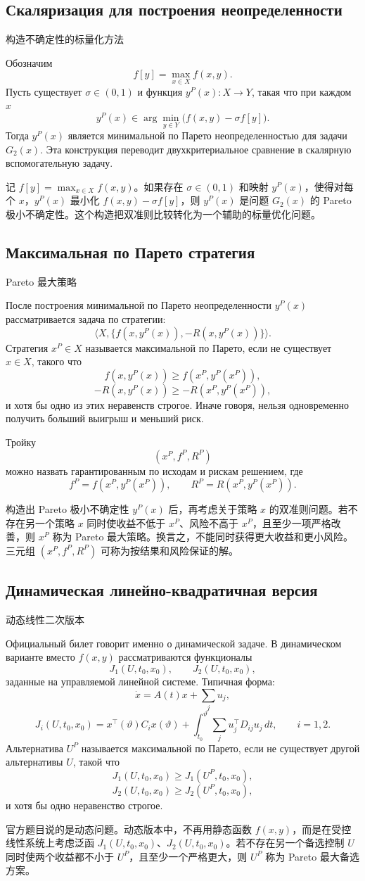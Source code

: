 \documentclass[12pt,a4paper]{article}
\newcommand{\zh}[1]{\par\noindent #1\par}
\begin{document}
\subsection*{Скаляризация для построения неопределенности}
\zh{构造不确定性的标量化方法}
Обозначим
\[
f[y]=\max_{x\in X}f(x,y).
\]
Пусть существует \(\sigma\in(0,1)\) и функция \(y^P(x):X\to Y\), такая что при каждом \(x\)
\[
y^P(x)\in \arg\min_{y\in Y}\bigl(f(x,y)-\sigma f[y]\bigr).
\]
Тогда \(y^P(x)\) является минимальной по Парето неопределенностью для задачи \(G_2(x)\). Эта конструкция переводит двухкритериальное сравнение в скалярную вспомогательную задачу.
\zh{记 \(f[y]=\max_{x\in X}f(x,y)\)。如果存在 \(\sigma\in(0,1)\) 和映射 \(y^P(x)\)，使得对每个 \(x\)，\(y^P(x)\) 最小化 \(f(x,y)-\sigma f[y]\)，则 \(y^P(x)\) 是问题 \(G_2(x)\) 的 Pareto 极小不确定性。这个构造把双准则比较转化为一个辅助的标量优化问题。}

\subsection*{Максимальная по Парето стратегия}
\zh{Pareto 最大策略}
После построения минимальной по Парето неопределенности \(y^P(x)\) рассматривается задача по стратегии:
\[
\langle X,\{f(x,y^P(x)),-R(x,y^P(x))\}\rangle.
\]
Стратегия \(x^P\in X\) называется максимальной по Парето, если не существует \(x\in X\), такого что
\[
f(x,y^P(x))\ge f(x^P,y^P(x^P)),
\]
\[
-R(x,y^P(x))\ge -R(x^P,y^P(x^P)),
\]
и хотя бы одно из этих неравенств строгое. Иначе говоря, нельзя одновременно получить больший выигрыш и меньший риск.

Тройку
\[
(x^P,f^P,R^P)
\]
можно назвать гарантированным по исходам и рискам решением, где
\[
f^P=f(x^P,y^P(x^P)),
\qquad
R^P=R(x^P,y^P(x^P)).
\]
\zh{构造出 Pareto 极小不确定性 \(y^P(x)\) 后，再考虑关于策略 \(x\) 的双准则问题。若不存在另一个策略 \(x\) 同时使收益不低于 \(x^P\)、风险不高于 \(x^P\)，且至少一项严格改善，则 \(x^P\) 称为 Pareto 最大策略。换言之，不能同时获得更大收益和更小风险。三元组 \((x^P,f^P,R^P)\) 可称为按结果和风险保证的解。}

\subsection*{Динамическая линейно-квадратичная версия}
\zh{动态线性二次版本}
Официальный билет говорит именно о динамической задаче. В динамическом варианте вместо \(f(x,y)\) рассматриваются функционалы
\[
J_1(U,t_0,x_0),
\qquad
J_2(U,t_0,x_0),
\]
заданные на управляемой линейной системе. Типичная форма:
\[
\dot x=A(t)x+\sum_j u_j,
\]
\[
J_i(U,t_0,x_0)=x^{\top}(\vartheta)C_i x(\vartheta)+
\int_{t_0}^{\vartheta}\sum_j u_j^{\top} D_{ij}u_j\,dt,
\qquad i=1,2.
\]
Альтернатива \(U^P\) называется максимальной по Парето, если не существует другой альтернативы \(U\), такой что
\[
J_1(U,t_0,x_0)\ge J_1(U^P,t_0,x_0),
\]
\[
J_2(U,t_0,x_0)\ge J_2(U^P,t_0,x_0),
\]
и хотя бы одно неравенство строгое.
\zh{官方题目说的是动态问题。动态版本中，不再用静态函数 \(f(x,y)\)，而是在受控线性系统上考虑泛函 \(J_1(U,t_0,x_0)\)、\(J_2(U,t_0,x_0)\)。若不存在另一个备选控制 \(U\) 同时使两个收益都不小于 \(U^P\)，且至少一个严格更大，则 \(U^P\) 称为 Pareto 最大备选方案。}
\end{document}
